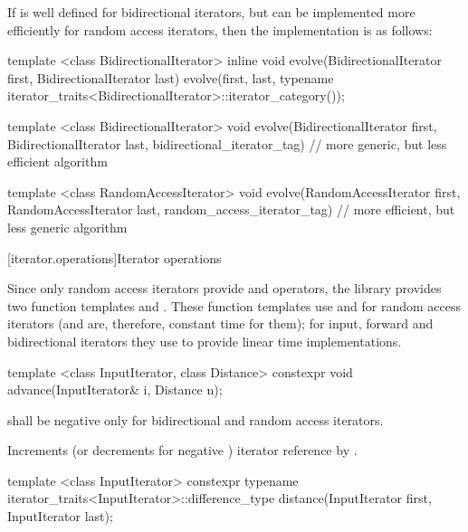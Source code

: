 \pnum
\begin{example}
If
is well defined for bidirectional iterators, but can be implemented more
efficiently for random access iterators, then the implementation is as follows:

\begin{codeblock}
template <class BidirectionalIterator>
inline void
evolve(BidirectionalIterator first, BidirectionalIterator last) {
  evolve(first, last,
    typename iterator_traits<BidirectionalIterator>::iterator_category());
}

template <class BidirectionalIterator>
void evolve(BidirectionalIterator first, BidirectionalIterator last,
  bidirectional_iterator_tag) {
  // more generic, but less efficient algorithm
}

template <class RandomAccessIterator>
void evolve(RandomAccessIterator first, RandomAccessIterator last,
  random_access_iterator_tag) {
  // more efficient, but less generic algorithm
}
\end{codeblock}
\end{example}

[iterator.operations]{Iterator operations}

\pnum
Since only random access iterators provide
\tcode{+}
and
\tcode{-}
operators, the library provides two
function templates
and
.
These
function templates
use
\tcode{+}
and
\tcode{-}
for random access iterators (and are, therefore, constant
time for them); for input, forward and bidirectional iterators they use
\tcode{++}
to provide linear time
implementations.

%
\begin{itemdecl}
template <class InputIterator, class Distance>
  constexpr void advance(InputIterator& i, Distance n);
\end{itemdecl}

\begin{itemdescr}
\pnum
\requires
{}
shall be negative only for bidirectional and random access iterators.

\pnum
\effects
Increments (or decrements for negative
)
iterator reference
by
.
\end{itemdescr}

%
\begin{itemdecl}
template <class InputIterator>
  constexpr typename iterator_traits<InputIterator>::difference_type
    distance(InputIterator first, InputIterator last);
\end{itemdecl}

